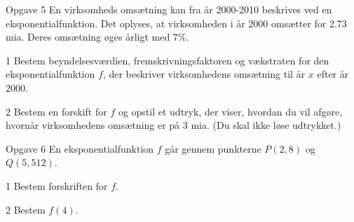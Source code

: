 \begin{opgavetekst}{Opgave 5}
	En virksomheds omsætning kan fra år 2000-2010 beskrives ved en eksponentialfunktion. Det oplyses, at virksomheden
	i år 2000 omsætter for 2.73 mia. Deres omsætning øges årligt med $7\%$. 
\end{opgavetekst}
\begin{delopgave}{}{1}
	Bestem beyndelsesværdien, fremskrivningsfaktoren og vækstraten for den eksponentialfunktion $f$, der beskriver 
	virksomhedens omsætning til år $x$ efter år 2000.
\end{delopgave}
\begin{delopgave}{}{2}
	Bestem en forskift for $f$ og opstil et udtryk, der viser, hvordan du vil afgøre, hvornår virksomhedens omsætning er
	på $3$ mia. (Du skal ikke løse udtrykket.)
\end{delopgave}
\begin{opgavetekst}{Opgave 6}
	En eksponentialfunktion $f$ går gennem punkterne $P(2,8)$ og $Q(5,512)$. 
\end{opgavetekst}
\begin{delopgave}{}{1}
	Bestem forskriften for $f$. 
\end{delopgave}
\begin{delopgave}{}{2}
	Bestem $f(4)$.
\end{delopgave}
